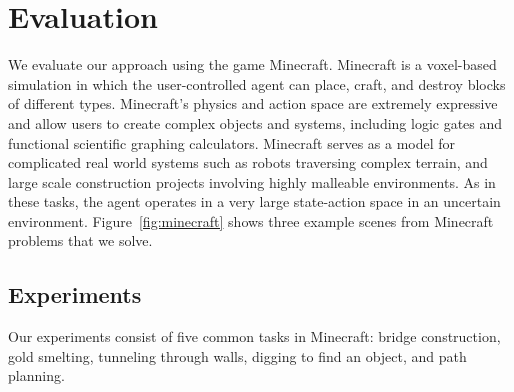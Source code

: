 \documentclass[11pt]{article}
\begin{document}
%
%
%

\section{Evaluation}
\label{sec:evaluation}

We evaluate our approach using the game Minecraft. Minecraft is a voxel-based simulation in which the user-controlled agent can place, craft, and destroy blocks of different types.
Minecraft's physics and action space are extremely expressive and allow users to create complex objects and systems, including logic gates and functional scientific graphing calculators.
Minecraft serves as a model for complicated real world systems such as robots traversing complex terrain, and large scale construction projects involving highly malleable environments.  As in these tasks, the agent operates in a very large state-action space in an uncertain environment. Figure~\ref{fig:minecraft} shows three example scenes from Minecraft problems that we solve.

\subsection{Experiments}
Our experiments consist of five common tasks in Minecraft:
bridge construction, gold smelting, tunneling through
walls, digging to find an object, and path planning.
\end{document}
